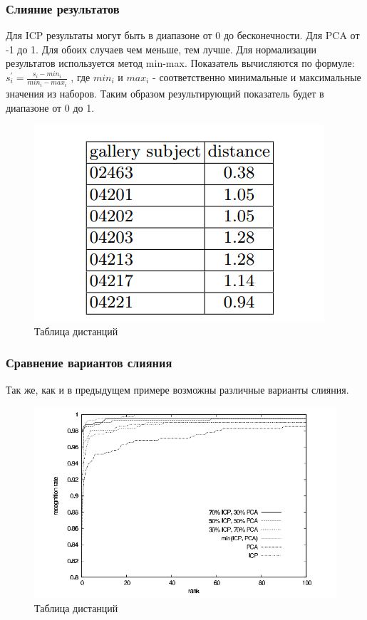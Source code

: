 \documentclass{beamer}
\begin{document}

\begin{frame}
\frametitle{Слияние результатов}

Для ICP результаты могут быть в диапазоне от 0 до бесконечности.
Для PCA от -1 до 1.
Для обоих случаев чем меньше, тем лучше.
Для нормализации результатов используется метод min-max.
Показатель вычисляются по формуле:
$s_i^\prime = \frac{s_i - min_i}{min_i - max_i}$
, где $min_i$ и $max_i$ - соответственно минимальные и максимальные значения из наборов.
Таким образом результирующий показатель будет в диапазоне от 0 до 1. 

\begin{figure}[h!]
\centering
\includegraphics[scale=0.60]{res/distances_table_2}
\caption{Таблица дистанций}
\end{figure}

\end{frame}


\begin{frame}
\frametitle{Сравнение вариантов слияния}

Так же, как и в предыдущем примере возможны различные варианты слияния.

\begin{figure}[h!]
\centering
\includegraphics[scale=0.40]{res/fusion_rates}
\caption{Таблица дистанций}
\end{figure}

\end{frame}
\end{document}
